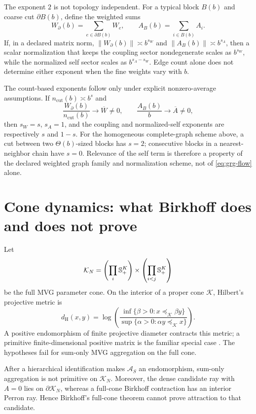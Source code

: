 The exponent \(2\) is not topology independent. For a typical block
\(B(b)\) and coarse cut \(\partial B(b)\), define the weighted sums
\[
W_{\partial}(b)=\sum_{e\in\partial B(b)}W_e,
\qquad
A_B(b)=\sum_{i\in B(b)}A_i.
\]
If, in a declared matrix norm,
\(\lVert W_{\partial}(b)\rVert\asymp b^{s_W}\) and
\(\lVert A_B(b)\rVert\asymp b^{s_A}\), then a scalar normalization that keeps
the coupling sector nondegenerate scales as \(b^{s_W}\), while the normalized
self sector scales as \(b^{s_A-s_W}\). Edge count alone does not determine
either exponent when the fine weights vary with \(b\).

The count-based exponents follow only under explicit nonzero-average
assumptions. If \(n_{\mathrm{cut}}(b)\asymp b^s\) and
\[
\frac{W_{\partial}(b)}{n_{\mathrm{cut}}(b)}\longrightarrow\overline W\ne0,
\qquad
\frac{A_B(b)}{b}\longrightarrow\overline A\ne0,
\]
then \(s_W=s\), \(s_A=1\), and the coupling and normalized-self exponents are
respectively \(s\) and \(1-s\). For the homogeneous complete-graph scheme
above, a cut between two \(\Theta(b)\)-sized blocks has \(s=2\); consecutive
blocks in a nearest-neighbor chain have \(s=0\). Relevance of the self term is
therefore a property of the declared
weighted graph family and normalization scheme, not of
\eqref{eq:grg-flow} alone. 

\section{Cone dynamics: what Birkhoff does and does not prove}
\label{sec:grg-cones}

Let
\begin{equation}
\mathcal K_N
=\left(\prod_i\mathbb S_{+}^K\right)
 \times\left(\prod_{i<j}\mathbb S_{+}^K\right)
\label{eq:grg-full-cone}
\end{equation}
be the full MVG parameter cone.  On the interior of a proper cone
\(\mathcal K\), Hilbert's projective metric is
\begin{equation}
d_{\mathrm H}(x,y)
=\log\left(
\frac{\inf\{\beta>0:x\preceq_{\mathcal K}\beta y\}}
{\sup\{\alpha>0:\alpha y\preceq_{\mathcal K}x\}}
\right).
\label{eq:grg-hilbert}
\end{equation}
A positive endomorphism of finite projective diameter contracts this metric;
a primitive finite-dimensional positive matrix is the familiar special
case \citep{Birkhoff1957,nussbaum1988hilbert}.  The hypotheses fail for
sum-only MVG aggregation on the full cone.

After a hierarchical identification makes \(\mathcal A_S\) an endomorphism,
sum-only aggregation is not primitive on \(\mathcal K_N\).  Moreover, the
dense candidate ray with \(A=0\) lies on \(\partial\mathcal K_N\), whereas a
full-cone Birkhoff contraction has an interior Perron ray.  Hence Birkhoff's
full-cone theorem cannot prove attraction to that candidate. 

